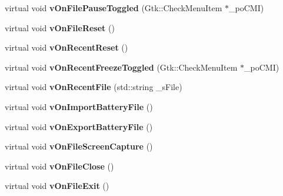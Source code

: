 \begin{DoxyCompactItemize}
\mbox{\label{class_v_b_a_1_1_window_a8cfc0cc364908602c3881304be30dfe4}} 
virtual void {\bfseries v\+On\+File\+Pause\+Toggled} (Gtk\+::\+Check\+Menu\+Item $\ast$\+\_\+po\+C\+MI)
\item 
\mbox{\label{class_v_b_a_1_1_window_acd364daa2b85fc1c6b34d096305d8b48}} 
virtual void {\bfseries v\+On\+File\+Reset} ()
\item 
\mbox{\label{class_v_b_a_1_1_window_a8f8de1653cccaa5c61312c68f4a037fe}} 
virtual void {\bfseries v\+On\+Recent\+Reset} ()
\item 
\mbox{\label{class_v_b_a_1_1_window_aed773f053d4ab731d5a555dc940c0195}} 
virtual void {\bfseries v\+On\+Recent\+Freeze\+Toggled} (Gtk\+::\+Check\+Menu\+Item $\ast$\+\_\+po\+C\+MI)
\item 
\mbox{\label{class_v_b_a_1_1_window_ab96850739fb7f53a370e6b6f059b87a9}} 
virtual void {\bfseries v\+On\+Recent\+File} (std\+::string \+\_\+s\+File)
\item 
\mbox{\label{class_v_b_a_1_1_window_aa376015acdd7b7fe83a67bc1306d3553}} 
virtual void {\bfseries v\+On\+Import\+Battery\+File} ()
\item 
\mbox{\label{class_v_b_a_1_1_window_a26d233092dd624a0bd3734ec0cdc0d7c}} 
virtual void {\bfseries v\+On\+Export\+Battery\+File} ()
\item 
\mbox{\label{class_v_b_a_1_1_window_ae96308c56cf84f9c56dc97c196adc49c}} 
virtual void {\bfseries v\+On\+File\+Screen\+Capture} ()
\item 
\mbox{\label{class_v_b_a_1_1_window_a9bb969481b9cfea3b5b5bc157ccc0ff6}} 
virtual void {\bfseries v\+On\+File\+Close} ()
\item 
\mbox{\label{class_v_b_a_1_1_window_acf22a1b1a9e46ac71e466f160d4e672e}} 
virtual void {\bfseries v\+On\+File\+Exit} ()
\item 
\mbox{\label{class_v_b_a_1_1_window_a1d969d55fcb1a69d13d3a29c9365e699}} 

\end{DoxyCompactItemize}

